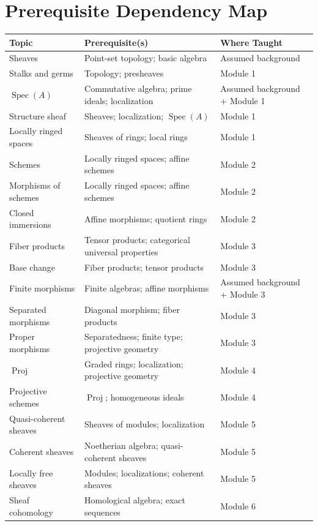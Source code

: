 \documentclass[11pt]{article}
\begin{document}
\section{Prerequisite Dependency Map}

\begin{longtable}{p{}p{}p{}}
\toprule
\textbf{Topic} & \textbf{Prerequisite(s)} & \textbf{Where Taught} \\
\midrule
Sheaves & Point-set topology; basic algebra & Assumed background \\
Stalks and germs & Topology; presheaves & Module 1 \\
$\operatorname{Spec}(A)$ & Commutative algebra; prime ideals; localization & Assumed background + Module 1 \\
Structure sheaf & Sheaves; localization; $\operatorname{Spec}(A)$ & Module 1 \\
Locally ringed spaces & Sheaves of rings; local rings & Module 1 \\
Schemes & Locally ringed spaces; affine schemes & Module 2 \\
Morphisms of schemes & Locally ringed spaces; affine schemes & Module 2 \\
Closed immersions & Affine morphisms; quotient rings & Module 2 \\
Fiber products & Tensor products; categorical universal properties & Module 3 \\
Base change & Fiber products; tensor products & Module 3 \\
Finite morphisms & Finite algebras; affine morphisms & Assumed background + Module 3 \\
Separated morphisms & Diagonal morphism; fiber products & Module 3 \\
Proper morphisms & Separatedness; finite type; projective geometry & Module 3 \\
$\operatorname{Proj}$ & Graded rings; localization; projective geometry & Module 4 \\
Projective schemes & $\operatorname{Proj}$; homogeneous ideals & Module 4 \\
Quasi-coherent sheaves & Sheaves of modules; localization & Module 5 \\
Coherent sheaves & Noetherian algebra; quasi-coherent sheaves & Module 5 \\
Locally free sheaves & Modules; localizations; coherent sheaves & Module 5 \\
Sheaf cohomology & Homological algebra; exact sequences & Module 6 \\

\end{longtable}
\end{document}
